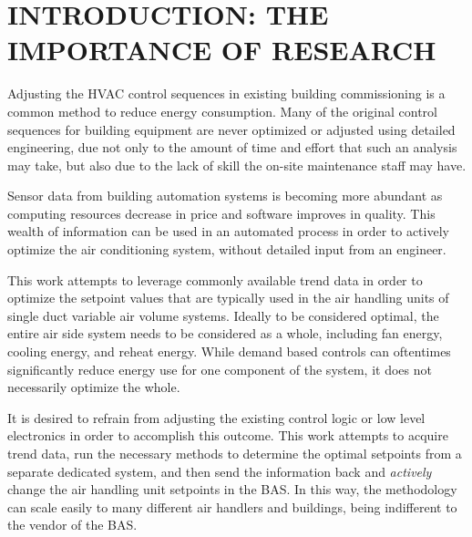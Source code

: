 %
%
%



\pagestyle{plain} %
\setcounter{page}{1}


\chapter{\uppercase {Introduction: The Importance of Research}}


Adjusting the HVAC control sequences in existing building commissioning is a common method to reduce energy consumption. Many of the original control sequences for building equipment are never optimized or adjusted using detailed engineering, due not only to the amount of time and effort that such an analysis may take, but also due to the lack of skill the on-site maintenance staff may have. 

Sensor data from building automation systems is becoming more abundant as computing resources decrease in price and software improves in quality. This wealth of information can be used in an automated process in order to actively optimize the air conditioning system, without detailed input from an engineer. 

This work attempts to leverage commonly available trend data in order to optimize the setpoint values that are typically used in the air handling units of single duct variable air volume systems. Ideally to be considered optimal, the entire air side system needs to be considered as a whole, including fan energy, cooling energy, and reheat energy. While demand based controls can oftentimes significantly reduce energy use for one component of the system, it does not necessarily optimize the whole. 

It is desired to refrain from adjusting the existing control logic or low level electronics in order to accomplish this outcome. This work attempts to acquire trend data, run the necessary methods to determine the optimal setpoints from a separate dedicated system, and then send the information back and \textit{actively} change the air handling unit setpoints in the BAS. In this way, the methodology can scale easily to many different air handlers and buildings, being indifferent to the vendor of the BAS.
